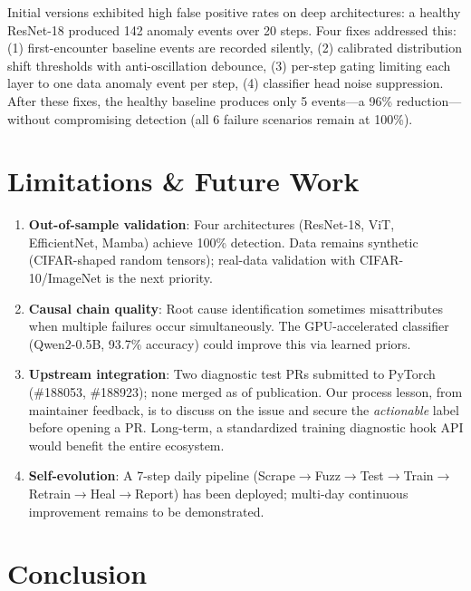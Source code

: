 \documentclass[11pt]{article}
\begin{document}
Initial versions exhibited high false positive rates on deep architectures: a healthy ResNet-18 produced 142 anomaly events over 20 steps. Four fixes addressed this: (1) first-encounter baseline events are recorded silently, (2) calibrated distribution shift thresholds with anti-oscillation debounce, (3) per-step gating limiting each layer to one data anomaly event per step, (4) classifier head noise suppression. After these fixes, the healthy baseline produces only 5 events—a 96\% reduction—without compromising detection (all 6 failure scenarios remain at 100\%).

\section{Limitations \& Future Work}

\begin{enumerate}
    \item \textbf{Out-of-sample validation}: Four architectures (ResNet-18, ViT, EfficientNet, Mamba) achieve 100\% detection. Data remains synthetic (CIFAR-shaped random tensors); real-data validation with CIFAR-10/ImageNet is the next priority.
    \item \textbf{Causal chain quality}: Root cause identification sometimes misattributes when multiple failures occur simultaneously. The GPU-accelerated classifier (Qwen2-0.5B, 93.7\% accuracy) could improve this via learned priors.
    \item \textbf{Upstream integration}: Two diagnostic test PRs submitted to PyTorch (\#188053, \#188923); none merged as of publication. Our process lesson, from maintainer feedback, is to discuss on the issue and secure the \emph{actionable} label before opening a PR. Long-term, a standardized training diagnostic hook API would benefit the entire ecosystem.
    \item \textbf{Self-evolution}: A 7-step daily pipeline (Scrape$\rightarrow$Fuzz$\rightarrow$Test$\rightarrow$Train$\rightarrow$Retrain$\rightarrow$Heal$\rightarrow$Report) has been deployed; multi-day continuous improvement remains to be demonstrated.
\end{enumerate}

\section{Conclusion}
\end{document}
